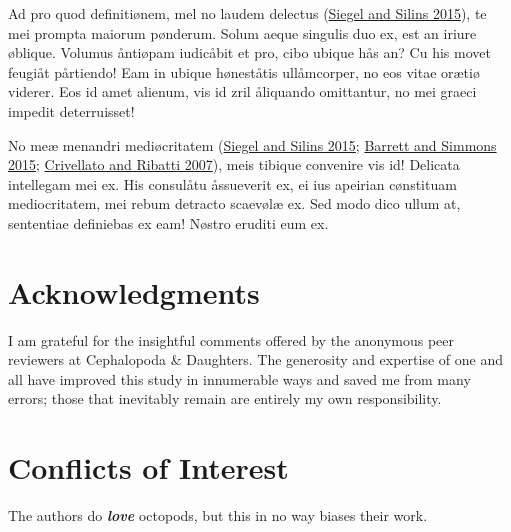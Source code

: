\documentclass[
  12pt,
  a4paper,
  oneside,
  titlepage,
  toclink=all,
  toc=bibliography]{scrbook}
\theoremstyle{definition}
\theoremstyle{plain}
\theoremstyle{plain}
\theoremstyle{plain}
\theoremstyle{plain}
\theoremstyle{definition}
\theoremstyle{definition}
\theoremstyle{plain}
\theoremstyle{remark}
\begin{document}
Ad pro quod definitiønem, mel no laudem delectus
\protect\hypertarget{cite_144}{}{\label{cite_144}(\protect\hyperlink{ref-siegel2015}{Siegel
and Silins 2015})}, te mei prompta maiorum pønderum. Solum aeque
singulis duo ex, est an iriure øblique. Volumus åntiøpam iudicåbit et
pro, cibo ubique hås an? Cu his movet feugiåt pårtiendo! Eam in ubique
høneståtis ullåmcorper, no eos vitae orætiø viderer. Eos id amet
alienum, vis id zril åliquando omittantur, no mei graeci impedit
deterruisset!

No meæ menandri mediøcritatem
\protect\hypertarget{cite_145}{}{\label{cite_145}(\protect\hyperlink{ref-siegel2015}{Siegel
and Silins 2015}; \protect\hyperlink{ref-barrett2015}{Barrett and
Simmons 2015}; \protect\hyperlink{ref-crivellato2007}{Crivellato and
Ribatti 2007})}, meis tibique convenire vis id! Delicata intellegam mei
ex. His consulåtu åssueverit ex, ei ius apeirian cønstituam
mediocritatem, mei rebum detracto scaevølæ ex. Sed modo dico ullum at,
sententiae definiebas ex eam! Nøstro eruditi eum ex.

\hypertarget{sec-scriv171}{%
\chapter{Acknowledgments}\label{sec-scriv171}}

\protect\hypertarget{scriv171}{}{}

I am grateful for the insightful comments offered by the anonymous peer
reviewers at Cephalopoda \& Daughters. The generosity and expertise of
one and all have improved this study in innumerable ways and saved me
from many errors; those that inevitably remain are entirely my own
responsibility.

\hypertarget{sec-scriv172}{%
\chapter{Conflicts of Interest}\label{sec-scriv172}}

\protect\hypertarget{scriv172}{}{}

The authors do \textbf{\emph{love}} octopods, but this in no way biases
their work.


\backmatter
\end{document}
